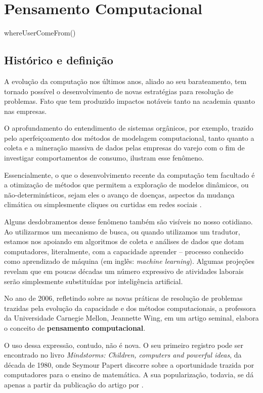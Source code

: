\chapter{Pensamento Computacional}\label{pensamento-computacional}
whereUserComeFrom()

\section{Histórico e definição}

A evolução da computação nos últimos anos, aliado ao seu barateamento, tem tornado possível o desenvolvimento de novas estratégias para resolução de problemas. Fato que tem produzido impactos notáveis tanto na academia quanto nas empresas.

O aprofundamento do entendimento de sistemas orgânicos, por exemplo, trazido pelo aperfeiçoamento dos métodos de modelagem computacional, tanto quanto a coleta e a mineração massiva de dados pelas empresas do varejo com o fim de investigar comportamentos de consumo, ilustram esse fenômeno.

Essencialmente, o que o desenvolvimento recente da computação tem facultado é a otimização de métodos que permitem a exploração de modelos dinâmicos, ou não-determinísticos, sejam eles o avanço de doenças, aspectos da mudança climática ou simplesmente cliques ou curtidas em redes sociais \cite{weintrop}. 

Alguns desdobramentos desse fenômeno também são visíveis no nosso cotidiano. Ao utilizarmos um mecanismo de busca, ou quando utilizamos um tradutor, estamos nos apoiando em algoritmos de coleta e análises de dados que dotam computadores, literalmente, com a capacidade aprender -- processo conhecido como aprendizado de máquina (em inglês: \textit{machine learning}). Algumas projeções revelam que em poucas décadas um número expressivo de atividades laborais serão simplesmente substituídas por inteligência artificial. %

No ano de 2006, refletindo sobre as novas práticas de resolução de problemas trazidas pela evolução da capacidade e dos métodos computacionais, a professora da Universidade Carnegie Mellon, Jeannette Wing, em um artigo seminal, elabora o conceito de \textbf{pensamento computacional}. 

O uso dessa expressão, contudo, não é nova. O seu primeiro registro pode ser encontrado no livro \textit{Mindstorms: Children, computers and powerful ideas}, da década de 1980, onde Seymour Papert discorre sobre a oportunidade trazida por computadores para o ensino de matemática. A sua popularização, todavia, se dá apenas a partir da publicação do artigo por .

